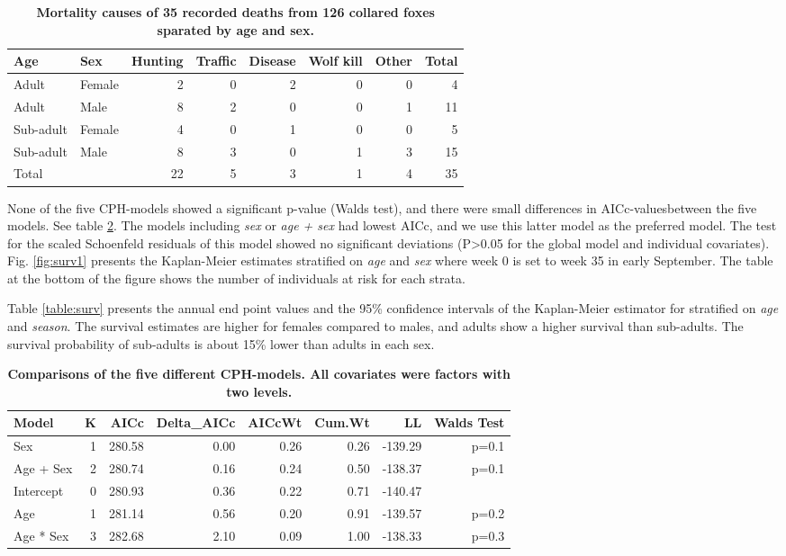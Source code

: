 \begin{table}[t]
\centering
\captionsetup{font=small}
\caption{\textbf{Mortality causes of 35 recorded deaths from 126 collared foxes sparated by age and sex.}}
\label{table:mort}
\begin{tabular}{llrrrrr|r}
\toprule
Age     & Sex      & Hunting & Traffic & Disease & Wolf kill & Other & Total \\
\midrule
Adult & Female     &  2 & 0 & 2 & 0 & 0 &   4 \\
Adult & Male       &  8 & 2 & 0 & 0 & 1 &  11 \\
Sub-adult & Female &  4 & 0 & 1 & 0 & 0 &   5 \\
Sub-adult & Male   &  8 & 3 & 0 & 1 & 3 &  15 \\
\midrule
Total   &    &       22 & 5 & 3 & 1 & 4   & 35 \\
\bottomrule
\end{tabular}
\end{table}

None of the five CPH-models showed a significant p-value (Walds test), and there were small differences in AICc-valuesbetween the five models. See table \ref{table:aic}. The models including \emph{sex} or \emph{age + sex} had lowest AICc, and we use this latter model as the preferred model. The test for the scaled Schoenfeld residuals of this model showed no significant deviations (P>0.05 for the global model and individual covariates). Fig. \ref{fig:surv1} presents the Kaplan-Meier estimates stratified on \emph{age} and \emph{sex} where week 0 is set to week 35 in early September. The table at the bottom of the figure shows the number of individuals at risk for each strata. 

Table \ref{table:surv} presents the annual end point values and the 95\% confidence intervals of the Kaplan-Meier estimator for stratified on \emph{age} and \emph{season}. The survival estimates are higher for females compared to males, and adults show a higher survival than sub-adults. The survival probability of sub-adults is about 15\% lower than adults in each sex.

\begin{table}[b]
\centering
\captionsetup{font=small}
\caption{\textbf{Comparisons of the five different CPH-models. All covariates were factors with two levels.}}
\label{table:aic}
\begin{tabular}{lrrrrrrr}
\toprule
Model    & K & AICc & Delta\_AICc & AICcWt & Cum.Wt & LL & Walds Test\\ 
\midrule
Sex        & 1 & 280.58 & 0.00 & 0.26 & 0.26 & -139.29 &  p=0.1 \\
Age + Sex  & 2 & 280.74 & 0.16 & 0.24 & 0.50 & -138.37 &  p=0.1 \\
Intercept  & 0 & 280.93 & 0.36 & 0.22 & 0.71 & -140.47 & \\ 
Age        & 1 & 281.14 & 0.56 & 0.20 & 0.91 & -139.57 &  p=0.2 \\ 
Age * Sex  & 3 & 282.68 & 2.10 & 0.09 & 1.00 & -138.33 &  p=0.3 \\
\bottomrule
\end{tabular}
\end{table}

